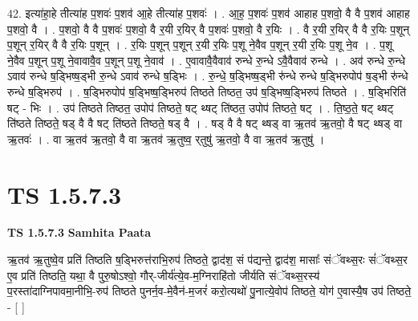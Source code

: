 \documentclass[17pt]{extarticle}
\begin{document}
42. इत्या॑हा॒हे तीत्या॑ह प॒शवः॑ प॒शव॑ आ॒हे तीत्या॑ह प॒शवः॑ । . आ॒ह॒ प॒शवः॑ प॒शव॑ आहाह प॒शवो॒ वै वै प॒शव॑ आहाह प॒शवो॒ वै । . प॒शवो॒ वै वै प॒शवः॑ प॒शवो॒ वै र॒यी र॒यिर् वै प॒शवः॑ प॒शवो॒ वै र॒यिः । . वै र॒यी र॒यिर् वै वै र॒यिः प॒शून् प॒शून् र॒यिर् वै वै र॒यिः प॒शून् । . र॒यिः प॒शून् प॒शून् र॒यी र॒यिः प॒शू ने॒वैव प॒शून् र॒यी र॒यिः प॒शू ने॒व । . प॒शू ने॒वैव प॒शून् प॒शू ने॒वावावै॒व प॒शून् प॒शू ने॒वाव॑ । . ए॒वावावै॒वैवाव॑ रुन्धे रु॒न्धे ऽवै॒वैवाव॑ रुन्धे । . अव॑ रुन्धे रु॒न्धे ऽवाव॑ रुन्धे ष॒ड्भिष्ष॒ड्भी रु॒न्धे ऽवाव॑ रुन्धे ष॒ड्भिः । . रु॒न्धे॒ ष॒ड्भिष्ष॒ड्भी रु॑न्धे रुन्धे ष॒ड्भिरुपोप॑ ष॒ड्भी रु॑न्धे रुन्धे ष॒ड्भिरुप॑ । . ष॒ड्भिरुपोप॑ ष॒ड्भिष्ष॒ड्भिरुप॑ तिष्ठते तिष्ठत॒ उप॑ ष॒ड्भिष्ष॒ड्भिरुप॑ तिष्ठते । . ष॒ड्भिरिति॑ षट् - भिः । . उप॑ तिष्ठते तिष्ठत॒ उपोप॑ तिष्ठते॒ षट् थ्षट् ति॑ष्ठत॒ उपोप॑ तिष्ठते॒ षट् । . ति॒ष्ठ॒ते॒ षट् थ्षट् ति॑ष्ठते तिष्ठते॒ षड् वै वै षट् ति॑ष्ठते तिष्ठते॒ षड् वै । . षड् वै वै षट् थ्षड् वा ऋ॒तव॑ ऋ॒तवो॒ वै षट् थ्षड् वा ऋ॒तवः॑ । . वा ऋ॒तव॑ ऋ॒तवो॒ वै वा ऋ॒तव॑ ऋ॒तुष्व॒ र्‌तुषु॑ ऋ॒तवो॒ वै वा ऋ॒तव॑ ऋ॒तुषु॑ । \newline
\pagebreak
{}
\section*{ TS 1.5.7.3 }

\textbf{TS 1.5.7.3 } \newline
\textbf{Samhita Paata} \newline

ऋ॒तव॑ ऋ॒तुष्वे॒व प्रति॑ तिष्ठति ष॒ड्भिरुत्त॑राभि॒रुप॑ तिष्ठते॒ द्वाद॑श॒ सं प॑द्यन्ते॒ द्वाद॑श॒ मासाः᳚ संॅवथ्स॒रः सं॑ॅवथ्स॒र ए॒व प्रति॑ तिष्ठति॒ यथा॒ वै पुरु॒षोऽश्वो॒ गौर्-जीर्य॑त्ये॒व-म॒ग्निराहि॑तो जीर्यति संॅवथ्स॒रस्य॑ प॒रस्ता॑दाग्निपावमा॒नीभि॒-रुप॑ तिष्ठते पुनर्न॒व-मे॒वैन॑-म॒जरं॑ करो॒त्यथो॑ पु॒नात्ये॒वोप॑ तिष्ठते॒ योग॑ ए॒वास्यै॒ष उप॑ तिष्ठते॒ - [ ] \newline
\end{document}
